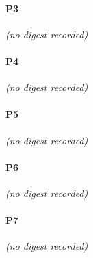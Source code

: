 \documentclass[11pt]{article}
\begin{document}
\paragraph*{P3}
\emph{(no digest recorded)}
\paragraph*{P4}
\emph{(no digest recorded)}
\paragraph*{P5}
\emph{(no digest recorded)}
\paragraph*{P6}
\emph{(no digest recorded)}
\paragraph*{P7}
\emph{(no digest recorded)}
\end{document}
